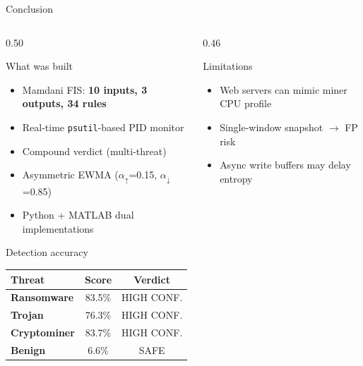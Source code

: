 \documentclass[aspectratio=169,12pt]{beamer}
\newcommand{\R}[1]{\textcolor{accent-r}{\textbf{#1}}}
\newcommand{\T}[1]{\textcolor{accent-t}{\textbf{#1}}}
\newcommand{\C}[1]{\textcolor{accent-c}{\textbf{#1}}}
\newcommand{\G}[1]{\textcolor{accent-g}{\textbf{#1}}}
\begin{document}
\begin{frame}{Conclusion}
  \begin{columns}[T]
    \begin{column}{0.50\textwidth}
      \begin{block}{What was built}
        \begin{itemize}\footnotesize\setlength{\itemsep}{1pt}
          \item Mamdani FIS: \textbf{10 inputs, 3 outputs, 34 rules}
          \item Real-time \texttt{psutil}-based PID monitor
          \item Compound verdict (multi-threat)
          \item Asymmetric EWMA ($\alpha_{\uparrow}$=0.15, $\alpha_{\downarrow}$=0.85)
          \item Python + MATLAB dual implementations
        \end{itemize}
      \end{block}
      \vspace{0.1em}
      \begin{block}{Detection accuracy}
        \scriptsize
        \setlength{\tabcolsep}{3pt}
        \renewcommand{\arraystretch}{1.0}
        \begin{tabular}{@{} l c c @{}}
          \toprule
          Threat & Score & Verdict \\
          \midrule
          \R{Ransomware}  & 83.5\% & HIGH CONF. \\
          \T{Trojan}      & 76.3\% & HIGH CONF. \\
          \C{Cryptominer} & 83.7\% & HIGH CONF. \\
          \G{Benign}      &  6.6\% & SAFE \\
          \bottomrule
        \end{tabular}
      \end{block}
    \end{column}
    \begin{column}{0.46\textwidth}
      \begin{alertblock}{Limitations}
        \begin{itemize}\footnotesize\setlength{\itemsep}{1pt}
          \item Web servers can mimic miner CPU profile
          \item Single-window snapshot $\to$ FP risk
          \item Async write buffers may delay entropy
        \end{itemize}

\end{alertblock}
\end{column}
\end{columns}
\end{frame}
\end{document}
